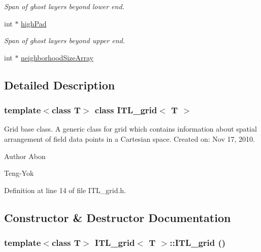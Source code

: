 \begin{DoxyCompactItemize}
\begin{DoxyCompactList}\small\item\em Span of ghost layers beyond lower end. \item\end{DoxyCompactList}\item 
int $\ast$ \hyperlink{classITL__grid_ac0d5d2e030b31036112cdcb3204d91ed}{highPad}
\begin{DoxyCompactList}\small\item\em Span of ghost layers beyond upper end. \item\end{DoxyCompactList}\item 
int $\ast$ \hyperlink{classITL__grid_a7f48b658a2978a050163c31bdce38524}{neighborhoodSizeArray}
\end{DoxyCompactItemize}


\subsection{Detailed Description}
\subsubsection*{template$<$class T$>$ class ITL\_\-grid$<$ T $>$}

Grid base class. A generic class for grid which contains information about spatial arrangement of field data points in a Cartesian space. Created on: Nov 17, 2010. \begin{DoxyAuthor}{Author}
Abon 

Teng-\/Yok 
\end{DoxyAuthor}


Definition at line 14 of file ITL\_\-grid.h.



\subsection{Constructor \& Destructor Documentation}
\hypertarget{classITL__grid_a8d06a30e48680ef7c7bd1a86f5008fa4}{
\subsubsection[{ITL\_\-grid}]{\setlength{\rightskip}{0pt plus 5cm}template$<$class T$>$ {\bf ITL\_\-grid}$<$ T $>$::{\bf ITL\_\-grid} ()}}
\label{classITL__grid_a8d06a30e48680ef7c7bd1a86f5008fa4}


